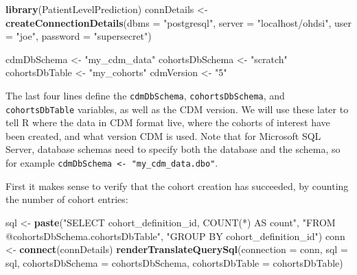\documentclass[11pt]{book}
\newenvironment{Shaded}{\begin{snugshade}}{\end{snugshade}}
\newcommand{\KeywordTok}[1]{\textcolor[rgb]{0.13,0.29,0.53}{\textbf{#1}}}
\newcommand{\DataTypeTok}[1]{\textcolor[rgb]{0.13,0.29,0.53}{#1}}
\newcommand{\StringTok}[1]{\textcolor[rgb]{0.31,0.60,0.02}{#1}}
\newcommand{\NormalTok}[1]{#1}
\begin{document}
\begin{Shaded}
\begin{Highlighting}[]
\KeywordTok{library}\NormalTok{(PatientLevelPrediction)}
\NormalTok{connDetails <-}\StringTok{ }\KeywordTok{createConnectionDetails}\NormalTok{(}\DataTypeTok{dbms =} \StringTok{"postgresql"}\NormalTok{,}
                                       \DataTypeTok{server =} \StringTok{"localhost/ohdsi"}\NormalTok{,}
                                       \DataTypeTok{user =} \StringTok{"joe"}\NormalTok{,}
                                       \DataTypeTok{password =} \StringTok{"supersecret"}\NormalTok{)}

\NormalTok{cdmDbSchema <-}\StringTok{ "my_cdm_data"}
\NormalTok{cohortsDbSchema <-}\StringTok{ "scratch"}
\NormalTok{cohortsDbTable <-}\StringTok{ "my_cohorts"}
\NormalTok{cdmVersion <-}\StringTok{ "5"}
\end{Highlighting}
\end{Shaded}

The last four lines define the \texttt{cdmDbSchema},
\texttt{cohortsDbSchema}, and \texttt{cohortsDbTable} variables, as well
as the CDM version. We will use these later to tell R where the data in
CDM format live, where the cohorts of interest have been created, and
what version CDM is used. Note that for Microsoft SQL Server, database
schemas need to specify both the database and the schema, so for example
\texttt{cdmDbSchema\ \textless{}-\ "my\_cdm\_data.dbo"}.

First it makes sense to verify that the cohort creation has succeeded,
by counting the number of cohort entries:

\begin{Shaded}
\begin{Highlighting}[]
\NormalTok{sql <-}\StringTok{ }\KeywordTok{paste}\NormalTok{(}\StringTok{"SELECT cohort_definition_id, COUNT(*) AS count"}\NormalTok{,}
\StringTok{"FROM @cohortsDbSchema.cohortsDbTable"}\NormalTok{,}
\StringTok{"GROUP BY cohort_definition_id"}\NormalTok{)}
\NormalTok{conn <-}\StringTok{ }\KeywordTok{connect}\NormalTok{(connDetails)}
\KeywordTok{renderTranslateQuerySql}\NormalTok{(}\DataTypeTok{connection =}\NormalTok{ conn, }
                        \DataTypeTok{sql =}\NormalTok{ sql,}
                        \DataTypeTok{cohortsDbSchema =}\NormalTok{ cohortsDbSchema,}
                        \DataTypeTok{cohortsDbTable =}\NormalTok{ cohortsDbTable)}
\end{Highlighting}
\end{Shaded}
\end{document}
